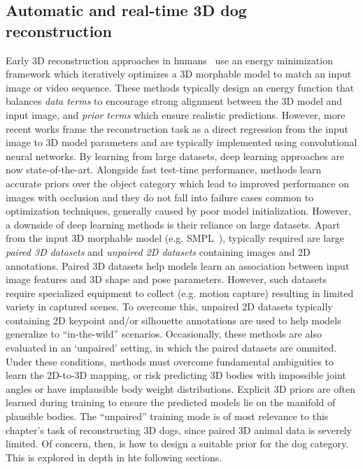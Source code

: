 \subsection{Automatic and real-time 3D dog reconstruction}

Early 3D reconstruction approaches in humans~ use an energy minimization framework which iteratively optimizes a 3D morphable model to match an input image or video sequence. These methods typically design an energy function that balances \emph{data terms} to encourage strong alignment between the 3D model and input image, and \emph{prior terms} which ensure realistic predictions. However, more recent works frame the reconstruction task as a direct regression from the input image to 3D model parameters and are typically implemented using convolutional neural networks. By learning from large datasets, deep learning approaches are now state-of-the-art. Alongside fast test-time performance, methods learn accurate priors over the object category which lead to improved performance on images with occlusion and they do not fall into failure cases common to optimization techniques, generally caused by poor model initialization. However, a downside of deep learning methods is their reliance on large datasets. Apart from the input 3D morphable model (e.g. SMPL~), typically required are large \emph{paired 3D datasets} and \emph{unpaired 2D datasets} containing images and 2D annotations. Paired 3D datasets help models learn an association between input image features and 3D shape and pose parameters. However, such datasets require specialized equipment to collect (e.g. motion capture) resulting in limited variety in captured scenes. To overcome this, unpaired 2D datasets typically containing 2D keypoint and/or silhouette annotations are used to help models generalize to ``in-the-wild'' scenarios. Occasionally, these methods are also evaluated in an `unpaired' setting, in which the paired datasets are ommited. Under these conditions, methods must overcome fundamental ambiguities to learn the 2D-to-3D mapping, or risk predicting 3D bodies with impossible joint angles or have implausible body weight distributions. Explicit 3D priors are often learned during training to ensure the predicted models lie on the manifold of plausible bodies. The ``unpaired'' training mode is of most relevance to this chapter's task of reconstructing 3D dogs, since paired 3D animal data is severely limited. Of concern, then, is how to design a suitable prior for the dog category. This is explored in depth in hte following sections.

